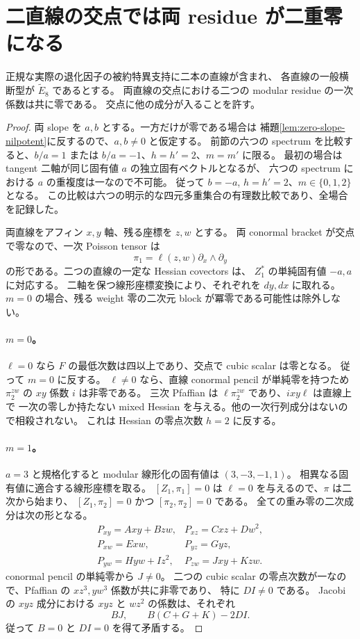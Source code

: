 \section{二直線の交点では両 residue が二重零になる}

\begin{proposition}\label{prop:two-lines}
正規な実際の退化因子の被約特異支持に二本の直線が含まれ、
各直線の一般横断型が $\widetilde E_8$ であるとする。
両直線の交点における二つの modular residue の一次係数は共に零である。
交点に他の成分が入ることを許す。
\end{proposition}

\begin{proof}
両 slope を $a,b$ とする。一方だけが零である場合は
補題\ref{lem:zero-slope-nilpotent}に反するので、$a,b\ne0$ と仮定する。
前節の六つの spectrum を比較すると、$b/a=1$ または
$b/a=-1$、$h=h'=2$、$m=m'$ に限る。
最初の場合は tangent 二軸が同じ固有値 $a$ の独立固有ベクトルとなるが、
六つの spectrum における $a$ の重複度は一なので不可能。
従って $b=-a$, $h=h'=2$、$m\in\{0,1,2\}$ となる。
この比較は六つの明示的な四元多重集合の有理数比較であり、全場合を記録した。

両直線をアフィン $x,y$ 軸、残る座標を $z,w$ とする。
両 conormal bracket が交点で零なので、一次 Poisson tensor は
\[
 \pi_1=\ell(z,w)\partial_x\wedge\partial_y
\]
の形である。二つの直線の一定な Hessian covectors は、
$Z_1^*$ の単純固有値 $-a,a$ に対応する。
二軸を保つ線形座標変換により、それぞれを $dy,dx$ に取れる。
$m=0$ の場合、残る weight 零の二次元 block が冪零である可能性は除外しない。

\paragraph{$m=0$。}
$\ell=0$ なら $F$ の最低次数は四以上であり、交点で cubic scalar は零となる。
従って $m=0$ に反する。
$\ell\ne0$ なら、直線 conormal pencil が単純零を持つため
$\pi_2^{zw}$ の $xy$ 係数 $i$ は非零である。
三次 Pfaffian は $\ell\pi_2^{zw}$ であり、$i xy\ell$ は直線上で
一次の零しか持たない mixed Hessian を与える。他の一次行列成分はないので相殺されない。
これは Hessian の零点次数 $h=2$ に反する。

\paragraph{$m=1$。}
$a=3$ と規格化すると modular 線形化の固有値は $(3,-3,-1,1)$。
相異なる固有値に適合する線形座標を取る。
$[Z_1,\pi_1]=0$ は $\ell=0$ を与えるので、$\pi$ は二次から始まり、
$[Z_1,\pi_2]=0$ かつ $[\pi_2,\pi_2]=0$ である。
全ての重み零の二次成分は次の形となる。
\[
\begin{array}{ll}
P_{xy}=Axy+Bzw,&P_{xz}=Cxz+Dw^2,\\
P_{xw}=Exw,&P_{yz}=Gyz,\\
P_{yw}=Hyw+Iz^2,&P_{zw}=Jxy+Kzw.
\end{array}
\]
conormal pencil の単純零から $J\ne0$。
二つの cubic scalar の零点次数が一なので、Pfaffian の $xz^3,yw^3$ 係数が共に非零であり、
特に $D I\ne0$ である。
Jacobi の $xyz$ 成分における $xyz$ と $wz^2$ の係数は、それぞれ
\[
 BJ,\qquad B(C+G+K)-2DI.
\]
従って $B=0$ と $DI=0$ を得て矛盾する。


\end{proof}
